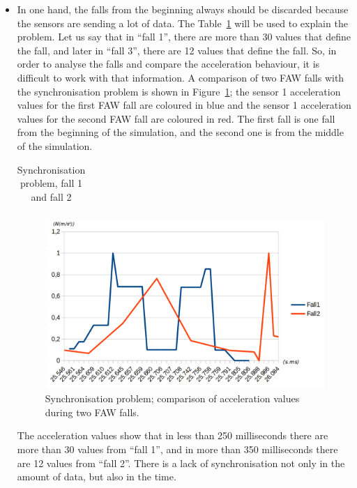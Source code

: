 \documentclass[conference]{IEEEtran}
\theoremstyle{definition}
\begin{document}
\begin{itemize}
 \item In one hand, the falls from the beginning always should be discarded because the sensors are 
 sending a lot of data. The Table~\ref{tabla:Synchro} will be used to explain the problem. Let us say 
 that in ``fall 1'', there are more than 30 values that define the fall, and later in ``fall 3'', there are 
 12 values that define the fall. So, in order to analyse the falls and compare the acceleration behaviour, it is 
 difficult to work with that information. A comparison of two FAW falls with the synchronisation problem is shown
 in Figure~\ref{fig:synchronisation1}; the sensor 1 acceleration values for the first FAW fall are coloured in blue and the
 sensor 1 acceleration values for the second FAW fall are coloured in red. The first fall is one fall from the beginning
 of the simulation, and the second one is from the middle of the simulation.
 
 \begin{table}[!h]
 \centering
 \begin{tabular}{*{5}{r}}
   
 \end{tabular}
 \caption{Synchronisation problem, fall 1 and fall 2}%
 \label{tabla:Synchro}
 \end{table}
 
 \begin{figure}[!h]
  \centering
  \includegraphics[scale=0.2]{img/synchronisation1.png}
  \caption[Comparison acceleration during two FAW falls]{Synchronisation problem; comparison of acceleration values during two FAW falls.}
  \label{fig:synchronisation1}
 \end{figure}
 
 The acceleration values show that in less than 250 milliseconds there are more than 30 values from ``fall 1'', and
 in more than 350 milliseconds there are 12 values from ``fall 2''. There is a lack of synchronisation not only in
 the amount of data, but also in the time.
 

\end{itemize}
\end{document}
